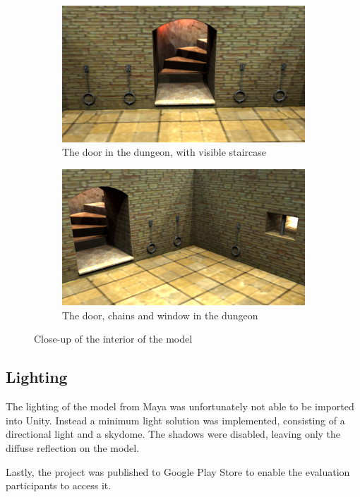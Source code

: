 \begin{figure}[h!]
    \centering
    \begin{subfigure}[h!]{0.7\textwidth}
    	\centering
        \includegraphics[width=\textwidth]{figures/interior0.png}
        \caption{The door in the dungeon, with visible staircase}\label{fig:interior0}
    \end{subfigure}
    \begin{subfigure}[h!]{0.7\textwidth}
    	\centering
        \includegraphics[width=\textwidth]{figures/interior1.png}
        \caption{The door, chains and window in the dungeon}\label{fig:interior1}
    \end{subfigure}
    \caption{Close-up of the interior of the model}\label{interior}
\end{figure}

\subsection{Lighting}
The lighting of the model from Maya was unfortunately not able to be imported into Unity. Instead a minimum light solution was implemented, consisting of a directional light and a skydome. The shadows were disabled, leaving only the diffuse reflection on the model.

Lastly, the project was published to Google Play Store to enable the evaluation participants to access it.


